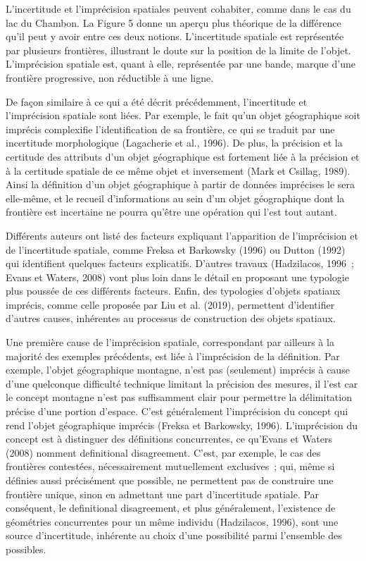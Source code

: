 L’incertitude et l’imprécision spatiales peuvent cohabiter, comme dans
le cas du lac du Chambon. La Figure 5 donne un aperçu plus théorique
de la différence qu’il peut y avoir entre ces deux
notions. L’incertitude spatiale est représentée par plusieurs
frontières, illustrant le doute sur la position de la limite de
l’objet. L’imprécision spatiale est, quant à elle, représentée par une
bande, marque d’une frontière progressive, non réductible à une ligne.

De façon similaire à ce qui a été décrit précédemment, l’incertitude
et l’imprécision spatiale sont liées. Par exemple, le fait qu’un objet
géographique soit imprécis complexifie l’identification de sa
frontière, ce qui se traduit par une incertitude morphologique
(Lagacherie et al., 1996). De plus, la précision et la certitude des
attributs d’un objet géographique est fortement liée à la précision et
à la certitude spatiale de ce même objet et inversement (Mark et
Csillag, 1989). Ainsi la définition d’un objet géographique à partir
de données imprécises le sera elle-même, et le recueil d’informations
au sein d’un objet géographique dont la frontière est incertaine ne
pourra qu’être une opération qui l’est tout autant.

Différents auteurs ont listé des facteurs expliquant l’apparition de
l’imprécision et de l’incertitude spatiale, comme Freksa et Barkowsky
(1996) ou Dutton (1992) qui identifient quelques facteurs
explicatifs. D’autres travaux (Hadzilacos, 1996 ; Evans et Waters,
2008) vont plus loin dans le détail en proposant une typologie plus
poussée de ces différents facteurs. Enfin, des typologies d’objets
spatiaux imprécis, comme celle proposée par Liu et al. (2019),
permettent d’identifier d’autres causes, inhérentes au processus de
construction des objets spatiaux.

Une première cause de l’imprécision spatiale, correspondant par
ailleurs à la majorité des exemples précédents, est liée à
l’imprécision de la définition. Par exemple, l’objet géographique
montagne, n’est pas (seulement) imprécis à cause d’une quelconque
difficulté technique limitant la précision des mesures, il l’est car
le concept montagne n’est pas suffisamment clair pour permettre la
délimitation précise d’une portion d’espace. C’est généralement
l’imprécision du concept qui rend l’objet géographique imprécis
(Freksa et Barkowsky, 1996). L’imprécision du concept est à distinguer
des définitions concurrentes, ce qu’Evans et Waters (2008) nomment
definitional disagreement. C’est, par exemple, le cas des frontières
contestées, nécessairement mutuellement exclusives ; qui, même si
définies aussi précisément que possible, ne permettent pas de
construire une frontière unique, sinon en admettant une part
d’incertitude spatiale. Par conséquent, le definitional disagreement,
et plus généralement, l’existence de géométries concurrentes pour un
même individu (Hadzilacos, 1996), sont une source d’incertitude,
inhérente au choix d’une possibilité parmi l’ensemble des possibles.

